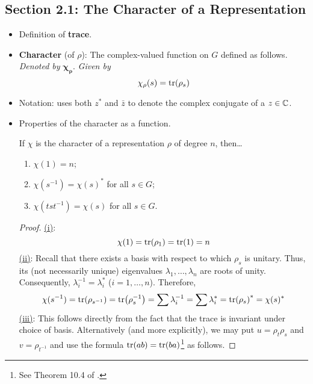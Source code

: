 \documentclass[../notes.tex]{subfiles}
\begin{document}
\subsection*{Section 2.1: The Character of a Representation}
\begin{itemize}
    \item {}Definition of \textbf{trace}.
    \item \textbf{Character} (of $\rho$): The complex-valued function on $G$ defined as follows. \emph{Denoted by} $\bm{\chi_\rho}$. \emph{Given by}
    \begin{equation*}
        \chi_\rho(s) = \tr(\rho_s)
    \end{equation*}
    \item Notation: \textcite{bib:Serre} uses both $z^*$ and $\bar{z}$ to denote the complex conjugate of a $z\in\mathbb{C}$.
    \item Properties of the character as a function.
    \begin{proposition}\label{prp:charPropsFun}
        If $\chi$ is the character of a representation $\rho$ of degree $n$, then\dots
        \begin{enumerate}[label={\textup{(\roman*)}}]
            \item $\chi(1)=n$;
            \item $\chi(s^{-1})=\chi(s)^*$ for all $s\in G$;
            \item $\chi(tst^{-1})=\chi(s)$ for all $s\in G$.
        \end{enumerate}
        \begin{proof}
            \underline{(i)}:
            \begin{equation*}
                \chi(1) = \tr(\rho_1)
                = \tr(1)
                = n
            \end{equation*}
            \underline{(ii)}: Recall that there exists a basis with respect to which $\rho_s$ is unitary. Thus, its (not necessarily unique) eigenvalues $\lambda_1,\dots,\lambda_n$ are roots of unity. Consequently, $\lambda_i^{-1}=\lambda_i^*$ ($i=1,\dots,n$). Therefore,
            \begin{equation*}
                \chi(s^{-1}) = \tr(\rho_{s^{-1}})
                = \tr(\rho_s^{-1})
                = \sum\lambda_i^{-1}
                = \sum\lambda_i^*
                = \tr(\rho_s)^*
                = \chi(s)^*
            \end{equation*}
            \underline{(iii)}: This follows directly from the fact that the trace is invariant under choice of basis. Alternatively (and more explicitly), we may put $u=\rho_t\rho_s$ and $v=\rho_{t^{-1}}$ and use the formula $\tr(ab)=\tr(ba)$\footnote{See Theorem 10.4 of \textcite{bib:Axler}.} as follows.

\end{proof}
\end{proposition}
\end{itemize}
\end{document}
